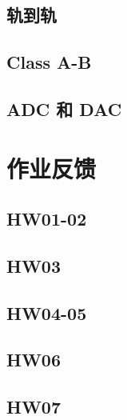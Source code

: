 \documentclass[cn,11pt,english,black,simple,device=ppt]{elegantbook}
\begin{document}
\chapter{轨到轨}



\chapter{Class A-B}



\chapter{ADC 和 DAC} 

 

\part{作业反馈}

\chapter{HW01-02}

 

\chapter{HW03}

 

\chapter{HW04-05}

 

\chapter{HW06}

 

\chapter{HW07}

 
\end{document}
